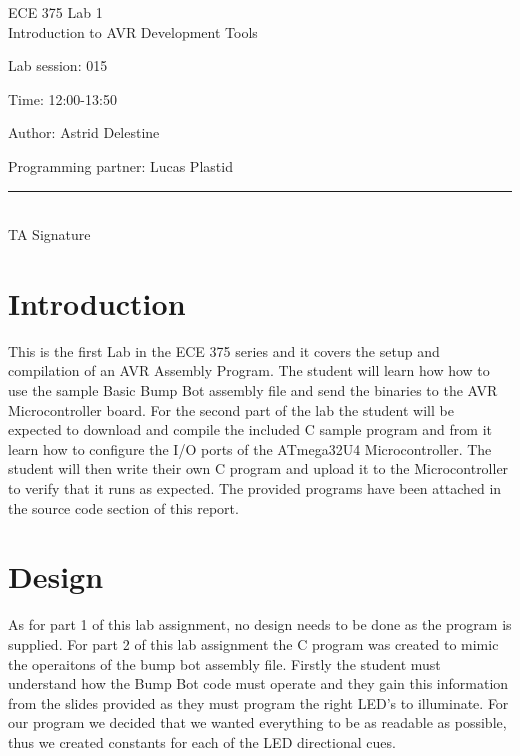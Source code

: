 \documentclass[12pt,letterpaper]{article}
\begin{document}
\begin{titlepage}
    \vspace*{4cm}
    \begin{flushright}
    {\huge
        ECE 375 Lab 1\\[1cm]
    }
    {\large
        Introduction to AVR Development Tools
    }
    \end{flushright}
    \begin{flushleft}
    Lab session: 015
    
    Time: 12:00-13:50
    \end{flushleft}
    \begin{flushright}
    Author: Astrid Delestine

    Programming partner: Lucas Plastid 

    \vfill
    \rule{5in}{.5mm}\\
    TA Signature
    \end{flushright}

\end{titlepage}

\section{Introduction}
This is the first Lab in the ECE 375 series and it covers the setup and compilation of an AVR Assembly Program. The student will learn how how to use the sample Basic Bump Bot assembly file and send the binaries to the AVR Microcontroller board. For the second part of the lab the student will be expected to download and compile the included C sample program and from it learn how to configure the I/O ports of the ATmega32U4 Microcontroller. The student will then write their own C program and upload it to the Microcontroller to verify that it runs as expected. The provided programs have been attached in the source code section of this report.

\section{Design}
As for part 1 of this lab assignment, no design needs to be done as the program is supplied. For part 2 of this lab assignment the C program was created to mimic the operaitons of the bump bot assembly file. Firstly the student must understand how the Bump Bot code must operate and they gain this information from the slides provided as they must program the right LED's to illuminate. For our program we decided that we wanted everything to be as readable as possible, thus we created constants for each of the LED directional cues. 
\end{document}
